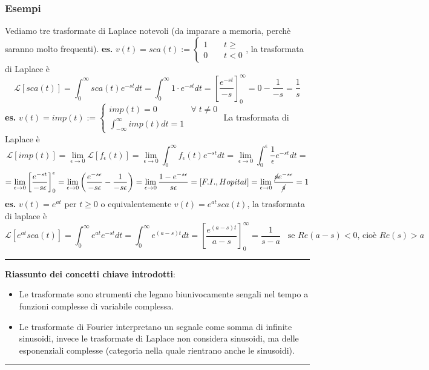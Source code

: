 \subsubsection{Esempi}
Vediamo tre trasformate di Laplace notevoli (da imparare a memoria, perchè saranno molto frequenti).\newline
\newline
\textbf{es.} $v(t) = sca(t) := \begin{cases}
    1 \;\;\;\; &t\geq\\ 0 &t<0 
\end{cases}$, la trasformata di Laplace è
\[
    \mathcal{L}[sca(t)] = \int_{0}^{\infty} sca(t)e^{-st} dt = \int_{0}^{\infty} 1 \cdot e^{-st}dt = \left[\frac{e^{-st}}{-s}\right]_0^\infty = 0 - \frac{1}{-s} = \frac{1}{s}
\]
\textbf{es.} $v(t) = imp(t) := \begin{cases}
    imp(t)=0 \;\;\;&\forall\;t \neq 0\\
    \int_{-\infty}^{\infty}imp(t) dt =1
\end{cases}$\newline
La trasformata di Laplace è
\[
    \mathcal{L}[imp(t)] = \lim_{\epsilon\rightarrow 0} \mathcal{L}[f_\epsilon(t)] = \lim_{\epsilon\rightarrow 0}\int_{0}^{\infty}f_\epsilon (t) e^{-st} dt = \lim_{\epsilon\rightarrow 0}\int_{0}^{\epsilon}\frac{1}{\epsilon}e^{-st}dt =
\]
\[
    = \lim_{\epsilon\rightarrow 0}\left[\frac{e^{-st}}{-s\epsilon}\right]_0^\epsilon = \lim_{\epsilon\rightarrow 0}\left( \frac{e^{-s\epsilon}}{-s\epsilon}- \frac{1}{-s\epsilon} \right) = \lim_{\epsilon\rightarrow 0} \frac{1- e^{-s \epsilon}}{s\epsilon} = [F.I., Hopital] = \lim_{\epsilon\rightarrow 0}\frac{\cancel{s}e^{-s\epsilon}}{\cancel{s}} = 1
\]
\textbf{es.} $v(t) = e^{at}$ per $t\geq 0$ o equivalentemente $v(t) = e^{at} sca(t)$, la trasformata di laplace è
\[
    \mathcal{L}[e^{at} sca(t)] = \int_{0}^{\infty}e^{at}e^{-st}dt = \int_{0}^{\infty}e^{(a-s)t}dt = \left[\frac{e^{(a-s)t}}{a-s}\right]_0^\infty = \frac{1}{s-a} \;\;\;\text{se $Re(a-s)<0$, cioè $Re(s)>a$}\;
\]
\rule{\textwidth}{0,4pt}\newline
\textbf{Riassunto dei concetti chiave introdotti}:
\begin{itemize}
    \item Le trasformate sono strumenti che legano biunivocamente sengali nel tempo a funzioni complesse di variabile complessa.
    \item Le trasformate di Fourier interpretano un segnale come somma di infinite sinusoidi, invece le trasformate di Laplace non considera sinusoidi, ma delle esponenziali complesse (categoria nella quale rientrano anche le sinusoidi).
\end{itemize}
\rule{\textwidth}{0,4pt}\newline
